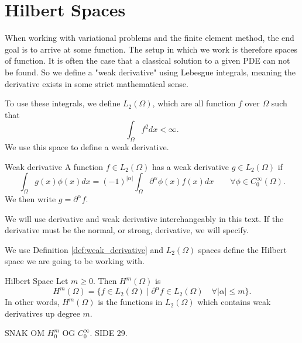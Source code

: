 \section{Hilbert Spaces}
When working with variational problems and the finite 
element method, the end goal is to arrive at some function.
The setup in which we work is therefore spaces of function. 
It is often the case that a classical solution to a given PDE can 
not be found. 
So we define a "weak derivative" using Lebesgue integrals, meaning 
the derivative exists in some strict mathematical sense. 

To use these integrals, we define $L_2(\Omega)$, which are all 
function $f$ over $\Omega$ such that 
\begin{equation*}
   \int_\Omega f^2 dx < \infty. 
\end{equation*}
We use this space to define a weak derivative.
\begin{defn}{Weak derivative}
    A function $f \in L_2(\Omega)$ has a weak derivative $g \in L_2(\Omega)$
    if
    \begin{equation*}
        \int_\Omega g(x)\phi(x) dx = (-1)^{|\alpha|}\int_\Omega 
        \partial ^{\alpha}\phi(x) f(x) dx
        \quad\quad \forall \phi \in C^\infty_0(\Omega).
    \end{equation*}
    We then write $g=\partial ^{\alpha}f$.
    \label{def:weak_derivative}
\end{defn}
We will use derivative and weak derivative interchangeably in this 
text.
If the derivative must be the normal, or strong, derivative, we will 
specify. 

We use Definition \ref*{def:weak_derivative} and $L_2(\Omega)$ spaces 
define the Hilbert space we are going to be working with. 
\begin{defn}{Hilbert Space}
   Let $m \geq 0$. Then $H^m(\Omega)$ is 
   \begin{equation*}
    H^m(\Omega) = \{  f \in L_2(\Omega) \mid \partial ^{\alpha}f \in 
    L_2(\Omega) \quad \forall |\alpha| \leq m  \}.
   \end{equation*}
   In other words, $H^m(\Omega)$ is the functions in $L_2(\Omega)$ 
   which contains weak derivatives up degree $m$.
\end{defn}

SNAK OM $H_0^m$ OG $C_0^{\infty}$. SIDE 29.
